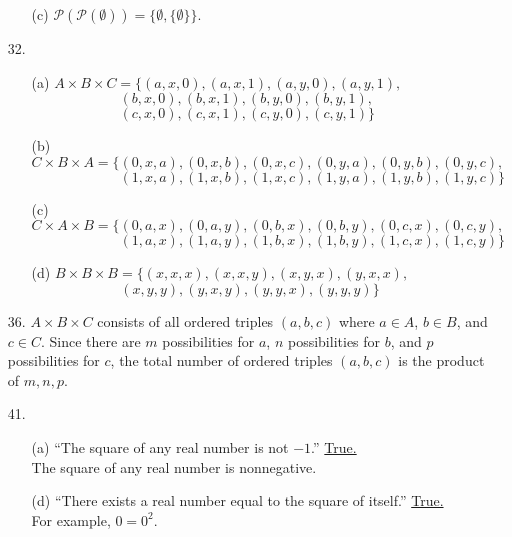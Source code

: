 \documentclass{article}
\begin{document}
\begin{enumerate}
\begin{itemize}
            \item[(c)]  $\mathcal{P}(\mathcal{P}(\emptyset)) = \{ \emptyset, \{ \emptyset \} \}$.
        \end{itemize}
    \item[32.]
        \begin{itemize}
            \item[(a)] $A \times B \times C = \{ (a,x,0), (a,x,1), (a,y,0), (a,y,1),$ \\
            $\phantom{A \times B \times C = \{ } (b,x,0), (b,x,1), (b,y,0), (b,y,1),$ \\
            $\phantom{A \times B \times C = \{ } (c,x,0), (c,x,1), (c,y,0), (c,y,1) \}$
            \item[(b)] $C \times B \times A = \{ (0,x,a), (0,x,b), (0,x,c), (0,y,a), (0,y,b), (0,y,c),$ \\
            $\phantom{C \times B \times A = \{ } (1,x,a), (1,x,b), (1,x,c), (1,y,a), (1,y,b), (1,y,c) \}$
            \item[(c)] $C \times A \times B = \{ (0,a,x), (0,a,y), (0,b,x), (0,b,y), (0,c,x), (0,c,y),$ \\
            $\phantom{C \times A \times B = \{ } (1,a,x), (1,a,y), (1,b,x), (1,b,y), (1,c,x), (1,c,y) \}$
            \item[(d)] $B \times B \times B = \{ (x,x,x), (x,x,y), (x,y,x), (y,x,x),$ \\
            $\phantom{B \times B \times B = \{ } (x,y,y), (y,x,y), (y,y,x), (y,y,y) \}$
        \end{itemize}
    \item[36.]  $A \times B \times C$ consists of all ordered triples $(a,b,c)$ where $a \in A$, $b \in B$, and $c \in C$. Since there are $m$ possibilities for $a$, $n$ possibilities for $b$, and $p$ possibilities for $c$, the total number of ordered triples $(a,b,c)$ is the product of $m,n,p$.
    \item[41.]
        \begin{itemize}
            \item[(a)] ``The square of any real number is not $-1$.'' \underline{True.} \\ The square of any real number is nonnegative.
            \item[(d)] ``There exists a real number equal to the square of itself.'' \underline{True.} \\ For example, $0 = 0^2$.
        \end{itemize}

\end{enumerate}
\end{document}
